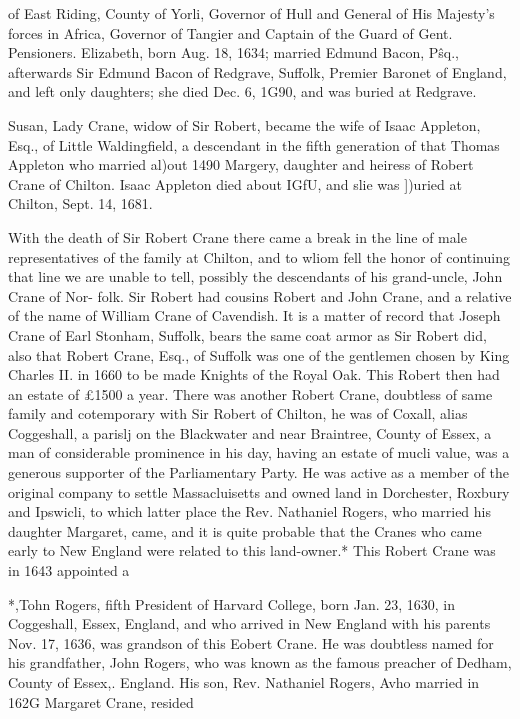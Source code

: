 of East Riding, County of Yorli, Governor of Hull and General 
of His Majesty's forces in Africa, Governor of Tangier and 
Captain of the Guard of Gent. Pensioners. Elizabeth, born Aug. 
18, 1634; married Edmund Bacon, P\^sq., afterwards Sir Edmund 
Bacon of Redgrave, Suffolk, Premier Baronet of England, and 
left only daughters; she died Dec. 6, 1G90, and was buried at 
Redgrave. 

Susan, Lady Crane, widow of Sir Robert, became the wife of 
Isaac Appleton, Esq., of Little Waldingfield, a descendant in the 
fifth generation of that Thomas Appleton who married al)out 1490 
Margery, daughter and heiress of Robert Crane of Chilton. 
Isaac Appleton died about IGfU, and slie was ])uried at Chilton, 
Sept. 14, 1681. 

With the death of Sir Robert Crane there came a break in the 
line of male representatives of the family at Chilton, and to 
wliom fell the honor of continuing that line we are unable to tell, 
possibly the descendants of his grand-uncle, John Crane of Nor- 
folk. Sir Robert had cousins Robert and John Crane, and a 
relative of the name of William Crane of Cavendish. It is a 
matter of record that Joseph Crane of Earl Stonham, Suffolk, 
bears the same coat armor as Sir Robert did, also that Robert 
Crane, Esq., of Suffolk was one of the gentlemen chosen by 
King Charles II. in 1660 to be made Knights of the Royal Oak. 
This Robert then had an estate of £1500 a year. There was 
another Robert Crane, doubtless of same family and cotemporary 
with Sir Robert of Chilton, he was of Coxall, alias Coggeshall, a 
parislj on the Blackwater and near Braintree, County of Essex, a 
man of considerable prominence in his day, having an estate of 
mucli value, was a generous supporter of the Parliamentary 
Party. He was active as a member of the original company to 
settle Massacluisetts and owned land in Dorchester, Roxbury and 
Ipswicli, to which latter place the Rev. Nathaniel Rogers, who 
married his daughter Margaret, came, and it is quite probable 
that the Cranes who came early to New England were related to 
this land-owner.* This Robert Crane was in 1643 appointed a 



*,Tohn Rogers, fifth President of Harvard College, born Jan. 23, 1630, 
in Coggeshall, Essex, England, and who arrived in New England with 
his parents Nov. 17, 1636, was grandson of this Eobert Crane. He was 
doubtless named for his grandfather, John Rogers, who was known as 
the famous preacher of Dedham, County of Essex,. England. His son, 
Rev. Nathaniel Rogers, Avho married in 162G Margaret Crane, resided 



